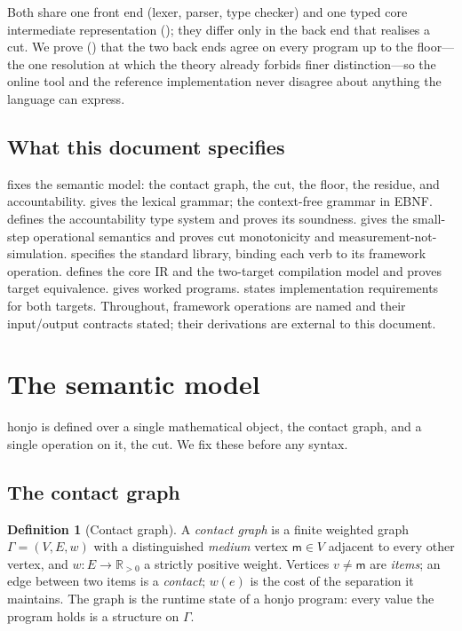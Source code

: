 \documentclass[11pt,a4paper]{article}
\theoremstyle{thmstyle}
\theoremstyle{definition}
\newtheorem{definition}[theorem]{Definition}
\theoremstyle{remark}
\newcommand{\R}{\mathbb{R}}
\newcommand{\medium}{\mathsf{m}}
\begin{document}
Both share one front end (lexer, parser, type checker) and one typed
core intermediate representation (); they differ only in the
back end that realises a cut. We prove () that the
two back ends agree on every program up to the floor---the one resolution
at which the theory already forbids finer distinction---so the online
tool and the reference implementation never disagree about anything the
language can express.

\subsection{What this document specifies}

 fixes the semantic model: the contact graph, the cut,
the floor, the residue, and accountability.  gives the
lexical grammar;  the context-free grammar in EBNF.
 defines the accountability type system and proves its
soundness.  gives the small-step operational semantics
and proves cut monotonicity and measurement-not-simulation.
 specifies the standard library, binding each verb to its
framework operation.  defines the core IR and the two-target
compilation model and proves target equivalence. 
gives worked programs.  states implementation requirements
for both targets. Throughout, framework operations are named and their
input/output contracts stated; their derivations are external to this
document.

\section{The semantic model}
\label{sec:model}

honjo is defined over a single mathematical object, the contact graph,
and a single operation on it, the cut. We fix these before any syntax.

\subsection{The contact graph}

\begin{definition}[Contact graph]
\label{def:contact-graph}
A \emph{contact graph} is a finite weighted graph $\Gamma=(V,E,w)$ with a
distinguished \emph{medium} vertex $\medium\in V$ adjacent to every other
vertex, and $w\colon E\to\R_{>0}$ a strictly positive weight. Vertices
$v\neq\medium$ are \emph{items}; an edge between two items is a
\emph{contact}; $w(e)$ is the cost of the separation it maintains. The
graph is the runtime state of a honjo program: every value the program
holds is a structure on $\Gamma$.
\end{definition}
\end{document}

